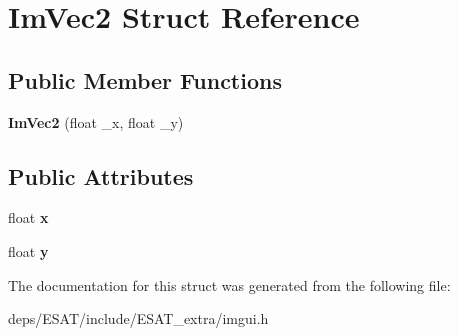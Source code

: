 \hypertarget{struct_im_vec2}{}\section{Im\+Vec2 Struct Reference}
\label{struct_im_vec2}
\subsection*{Public Member Functions}
\begin{DoxyCompactItemize}
\item 
\mbox{\label{struct_im_vec2_af2fd51a6c4bf6290676b235533b92c0d}} 
{\bfseries Im\+Vec2} (float \+\_\+x, float \+\_\+y)
\end{DoxyCompactItemize}
\subsection*{Public Attributes}
\begin{DoxyCompactItemize}
\item 
\mbox{\label{struct_im_vec2_a5802a68560961ed8cb8cc5fb2a244c2d}} 
float {\bfseries x}
\item 
\mbox{\label{struct_im_vec2_a1f9d136ca837e147b793b19d25a3a618}} 
float {\bfseries y}
\end{DoxyCompactItemize}


The documentation for this struct was generated from the following file\+:\begin{DoxyCompactItemize}
\item 
deps/\+E\+S\+A\+T/include/\+E\+S\+A\+T\+\_\+extra/imgui.\+h\end{DoxyCompactItemize}
